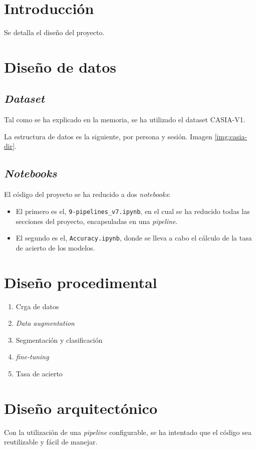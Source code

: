 
\section{Introducción}

Se detalla el diseño del proyecto.

\section{Diseño de datos}

\subsection{\textit{Dataset}} \label{anx:dataset}

Tal como se ha explicado en la memoria, se ha utilizado el dataset CASIA-V1.

La estructura de datos es la siguiente, por persona y sesión. Imagen \ref{img:casia-dir}.


\subsection{\textit{Notebooks}}

El código del proyecto se ha reducido a dos \textit{notebooks}:


\begin{itemize}
    \item El primero es el, \texttt{9-pipelines\_v7.ipynb}, en el cual se ha reducido todas las secciones del proyecto, encapsuladas en una \textit{pipeline}.
    \item El segundo es el, \texttt{Accuracy.ipynb}, donde se lleva a cabo el cálculo de la tasa de acierto de los modelos.
\end{itemize}


\section{Diseño procedimental}

\begin{enumerate}
    \item Crga de datos
    \item \textit{Data augmentation}
    \item Segmentación y clasificación
    \item \textit{fine-tuning}
    \item Tasa de acierto
    \end{enumerate}

\section{Diseño arquitectónico}

Con la utilización de una \textit{pipeline} configurable, se ha intentado que el código sea reutilizable y fácil de manejar.
